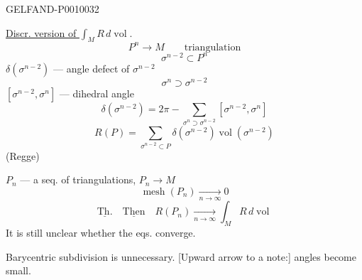 \begin{GelfandAdjacentEvidence}{GELFAND-P001003}{2}


\underline{Discr. version of $\displaystyle\int_M R\,d\operatorname{vol}$}.
\begin{equation*}
P^n\longrightarrow M\qquad\text{triangulation}
\tag{12}
\end{equation*}
\[
\sigma^{n-2}\subset P^n
\]
$\delta(\sigma^{n-2})$ --- angle defect of $\sigma^{n-2}$
\[
\sigma^n\supset\sigma^{n-2}
\]
$[\sigma^{n-2},\sigma^n]$ --- dihedral angle
\begin{equation*}
\delta(\sigma^{n-2})=2\pi-\sum_{\sigma^n\supset\sigma^{n-2}}[\sigma^{n-2},\sigma^n]
\tag{13}
\end{equation*}
\begin{equation*}
R(P)=\sum_{\sigma^{n-2}\subset P}\delta(\sigma^{n-2})\operatorname{vol}(\sigma^{n-2})
\tag{14}
\end{equation*}
(Regge)

$P_n$ --- a seq. of triangulations, $P_n\to M$
\begin{equation*}
\operatorname{mesh}(P_n)\underset{n\to\infty}{\longrightarrow}0
\tag{15}
\end{equation*}
\begin{equation*}
\underline{\text{Th.}}\quad\underline{\text{Then}}\quad
R(P_n)\underset{n\to\infty}{\longrightarrow}\int_M R\,d\operatorname{vol}
\tag{16}
\end{equation*}
It is still unclear whether the eqs. converge.

Barycentric subdivision is unnecessary.
[Upward arrow to a note:] angles become small.
\end{GelfandAdjacentEvidence}
